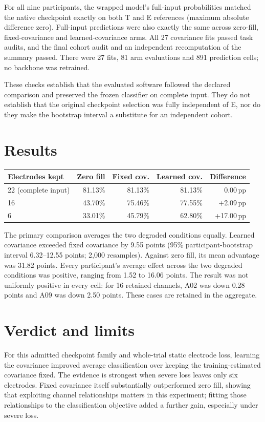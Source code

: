 \documentclass[11pt,a4paper]{article}
\newcommand{\pp}{\,pp}
\begin{document}
For all nine participants, the wrapped model's full-input probabilities matched the native checkpoint exactly on both T and E references (maximum absolute difference zero). Full-input predictions were also exactly the same across zero-fill, fixed-covariance and learned-covariance arms. All 27 covariance fits passed task audits, and the final cohort audit and an independent recomputation of the summary passed. There were 27 fits, 81 arm evaluations and 891 prediction cells; no backbone was retrained.

These checks establish that the evaluated software followed the declared comparison and preserved the frozen classifier on complete input. They do not establish that the original checkpoint selection was fully independent of E, nor do they make the bootstrap interval a substitute for an independent cohort.

\section{Results}
\begin{center}
\begin{tabular}{@{}lrrrr@{}}\toprule
Electrodes kept & Zero fill & Fixed cov. & Learned cov. & Difference \\
\midrule
22 (complete input) & 81.13\% & 81.13\% & 81.13\% & 0.00\pp\\
16 & 43.70\% & 75.46\% & 77.55\% & +2.09\pp\\
6 & 33.01\% & 45.79\% & 62.80\% & +17.00\pp\\
\bottomrule
\end{tabular}
\end{center}
The primary comparison averages the two degraded conditions equally. Learned covariance exceeded fixed covariance by 9.55 points (95\% participant-bootstrap interval 6.32--12.55 points; 2,000 resamples). Against zero fill, its mean advantage was 31.82 points. Every participant's average effect across the two degraded conditions was positive, ranging from 1.52 to 16.06 points. The result was not uniformly positive in every cell: for 16 retained channels, A02 was down 0.28 points and A09 was down 2.50 points. These cases are retained in the aggregate.

\section{Verdict and limits}
For this admitted checkpoint family and whole-trial static electrode loss, learning the covariance improved average classification over keeping the training-estimated covariance fixed. The evidence is strongest when severe loss leaves only six electrodes. Fixed covariance itself substantially outperformed zero fill, showing that exploiting channel relationships matters in this experiment; fitting those relationships to the classification objective added a further gain, especially under severe loss.
\end{document}
